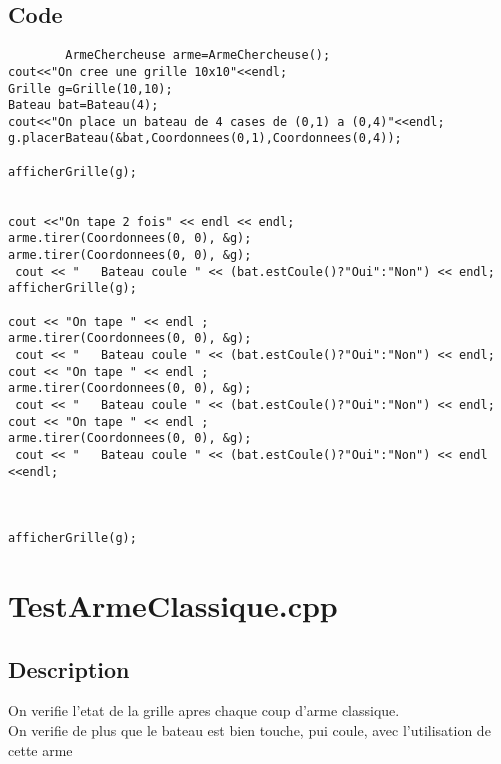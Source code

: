         \subsection{Code}
	\begin{lstlisting}
		ArmeChercheuse arme=ArmeChercheuse();
cout<<"On cree une grille 10x10"<<endl;
Grille g=Grille(10,10);
Bateau bat=Bateau(4);
cout<<"On place un bateau de 4 cases de (0,1) a (0,4)"<<endl;
g.placerBateau(&bat,Coordonnees(0,1),Coordonnees(0,4));

afficherGrille(g);


cout <<"On tape 2 fois" << endl << endl;
arme.tirer(Coordonnees(0, 0), &g);
arme.tirer(Coordonnees(0, 0), &g);
 cout << "   Bateau coule " << (bat.estCoule()?"Oui":"Non") << endl;
afficherGrille(g);

cout << "On tape " << endl ;
arme.tirer(Coordonnees(0, 0), &g);
 cout << "   Bateau coule " << (bat.estCoule()?"Oui":"Non") << endl;
cout << "On tape " << endl ;
arme.tirer(Coordonnees(0, 0), &g);
 cout << "   Bateau coule " << (bat.estCoule()?"Oui":"Non") << endl;
cout << "On tape " << endl ;
arme.tirer(Coordonnees(0, 0), &g);
 cout << "   Bateau coule " << (bat.estCoule()?"Oui":"Non") << endl <<endl;



afficherGrille(g);
	\end{lstlisting}
    \section{TestArmeClassique.cpp}
        \subsection{Description}
            On verifie l'etat de la grille apres chaque coup d'arme classique.\\
            On verifie de plus que le bateau est bien touche, pui coule, avec l'utilisation de cette arme
